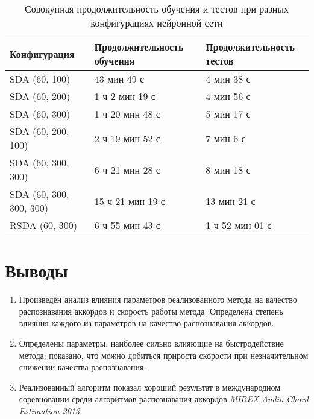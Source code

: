 \begin{table} [htbp]
  \centering
  \parbox{15cm}{\caption{Совокупная продолжительность обучения и тестов при
  разных конфигурациях нейронной сети}
  \label{TTimeConf}}
  \begin{tabular}{|l|l|l|}
  \hline
  Конфигурация & Продолжительность обучения & Продолжительность тестов \\
  \hline
  SDA (60, 100) & 43 мин 49 с & 4 мин 38 с \\
  SDA (60, 200) & 1 ч 2 мин 19 с & 4 мин 56 с \\
  SDA (60, 300) & 1 ч 20 мин 48 с & 5 мин 17 с \\
  SDA (60, 200, 100) & 2 ч 19 мин 52 с & 7 мин 6 с \\
  SDA (60, 300, 300) & 6 ч 21 мин 28 с & 8 мин 18 с \\
  SDA (60, 300, 300, 300) & 15 ч 21 мин 19 с & 13 мин 21 с \\
  RSDA (60, 300) & 6 ч 55 мин 43 с & 1 ч 52 мин 01 с\\
  \hline
  \end{tabular}
\end{table}

\section{Выводы}

\begin{enumerate}
  \item Произведён анализ влияния параметров реализованного метода на качество
  распознавания аккордов и скорость работы метода. Определена степень влияния
  каждого из параметров на качество распознавания аккордов.
  \item Определены параметры, наиболее сильно влияющие на быстродействие метода;
  показано, что можно добиться прироста скорости при незначительном снижении
  качества распознавания.
  \item Реализованный алгоритм показал хороший результат в международном
  соревновании среди алгоритмов распознавания аккордов \emph{MIREX Audio Chord
  Estimation 2013}.
\end{enumerate}


\clearpage